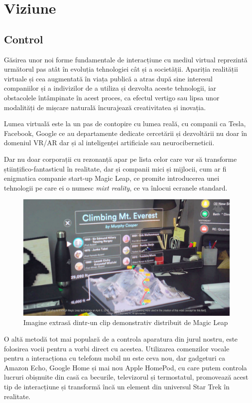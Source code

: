 \chapter {Viziune}

\section{Control}

Găsirea unor noi forme fundamentale de interacțiune cu mediul virtual reprezintă următorul pas atât în evoluția tehnologiei cât și a societății. Apariția realității virtuale și cea augmentată în viața publică a atras după sine interesul companiilor și a indivizilor de a utiliza și dezvolta aceste tehnologii, iar obstacolele întâmpinate în acest proces, ca efectul vertigo sau lipsa unor modalități de mișcare naturală încurajează creativitatea și inovația.

Lumea virtuală este la un pas de contopire cu lumea reală, cu companii ca Tesla, Facebook, Google ce au departamente dedicate cercetării și dezvoltării nu doar în domeniul VR/AR dar și al inteligenței artificiale sau neurociberneticii.

Dar nu doar corporații cu rezonanță apar pe lista celor care vor să transforme științifico-fantasticul în realitate, dar și companii mici și mijlocii, cum ar fi enigmatica companie start-up Magic Leap, ce promite introducerea unei tehnologii pe care ei o numesc \textit{mixt reality}, ce va înlocui ecranele standard.

\begin{figure}[h]
  \centering
  \includegraphics[scale=0.27]{img/magicleap.jpg}
  \caption{Imagine extrasă dintr-un clip demonstrativ distribuit de Magic Leap}
\end{figure}

O altă metodă tot mai populară de a controla aparatura din jurul nostru, este folosirea vocii pentru a vorbi direct cu acestea. Utilizarea comenzilor vocale pentru a interacționa cu telefonu mobil nu este ceva nou, dar gadgeturi ca Amazon Echo, Google Home și mai nou Apple HomePod, cu care putem controla lucruri obișnuite din casă ca becurile, televizorul și termostatul, promovează acest tip de interacțiune și transformă încă un element din universul Star Trek în realitate.

